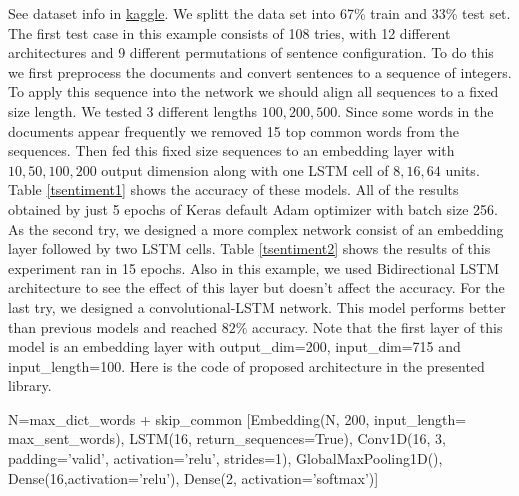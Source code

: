 \documentclass[10pt]{SelfArx} %
\begin{document}
	See dataset info in \href{https://www.kaggle.com/ashukr/rnnsentiment-data}{kaggle}. We splitt the data set into 67\% train and 33\% test set. The first test case in this example consists of 108 tries, with 12 different architectures and 9 different permutations of sentence configuration. To do this we first preprocess the documents and convert sentences to a sequence of integers. To apply this sequence into the network we should align all sequences to a fixed size length. We tested 3 different lengths $100,200,500$. Since some words in the documents appear frequently we removed 15 top common words from the sequences. Then fed this fixed size sequences to an embedding layer with $10,50,100,200$ output dimension along with one LSTM cell of $8,16,64$ units. Table \ref{tsentiment1} shows the accuracy of these models. All of the results obtained by just 5 epochs of Keras default Adam optimizer with batch size 256.  As the second try, we designed a more complex network consist of an embedding layer followed by two LSTM cells. Table \ref{tsentiment2} shows the results of this experiment ran in 15 epochs. Also in this example, we used Bidirectional LSTM architecture to see the effect of this layer but doesn't affect the accuracy.  For the last try, we designed a convolutional-LSTM network. This model performs better than previous models and reached $82\%$ accuracy. Note that the first layer of this model is an embedding layer with output\_dim=200, input\_dim=715 and input\_length=100. Here is the code of proposed architecture in the presented library.
	\begin{python}
N=max_dict_words + skip_common
[Embedding(N, 200, input_length=
max_sent_words), 
LSTM(16, return_sequences=True),
Conv1D(16, 3, padding='valid',
activation='relu', strides=1),
GlobalMaxPooling1D(),
Dense(16,activation='relu'),
Dense(2, activation='softmax')]
\end{python}
\end{document}
